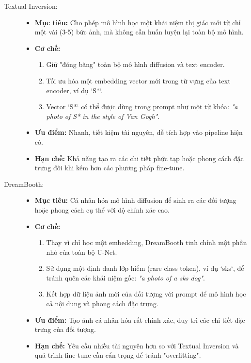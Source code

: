 \begin{description}
	\item[Textual Inversion:] \cite{Gal2022_textual} 
	\begin{itemize}
		\item \textbf{Mục tiêu:} Cho phép mô hình học một khái niệm thị giác mới từ chỉ một vài (3-5) bức ảnh, mà không cần huấn luyện lại toàn bộ mô hình.
		\item \textbf{Cơ chế:} 
		\begin{enumerate}
			\item Giữ "đóng băng" toàn bộ mô hình diffusion và text encoder.
			\item Tối ưu hóa một embedding vector mới trong từ vựng của text encoder, ví dụ `S*`.
			\item Vector `S*` có thể được dùng trong prompt như một từ khóa: \textit{"a photo of S* in the style of Van Gogh"}.
		\end{enumerate}
		\item \textbf{Ưu điểm:} Nhanh, tiết kiệm tài nguyên, dễ tích hợp vào pipeline hiện có.
		\item \textbf{Hạn chế:} Khả năng tạo ra các chi tiết phức tạp hoặc phong cách đặc trưng đôi khi kém hơn các phương pháp fine-tune.
	\end{itemize}
	
	\item[DreamBooth:] \cite{Ruiz2023_dreambooth}
	\begin{itemize}
		\item \textbf{Mục tiêu:} Cá nhân hóa mô hình diffusion để sinh ra các đối tượng hoặc phong cách cụ thể với độ chính xác cao.
		\item \textbf{Cơ chế:} 
		\begin{enumerate}
			\item Thay vì chỉ học một embedding, DreamBooth tinh chỉnh một phần nhỏ của toàn bộ U-Net.
			\item Sử dụng một định danh lớp hiếm (rare class token), ví dụ `sks`, để tránh quên các khái niệm gốc: \textit{"a photo of a sks dog"}.
			\item Kết hợp dữ liệu ảnh mới của đối tượng với prompt để mô hình học cả nội dung và phong cách đặc trưng.
		\end{enumerate}
		\item \textbf{Ưu điểm:} Tạo ảnh cá nhân hóa rất chính xác, duy trì các chi tiết đặc trưng của đối tượng.
		\item \textbf{Hạn chế:} Yêu cầu nhiều tài nguyên hơn so với Textual Inversion và quá trình fine-tune cần cẩn trọng để tránh "overfitting".
	\end{itemize}
	

\end{description}
